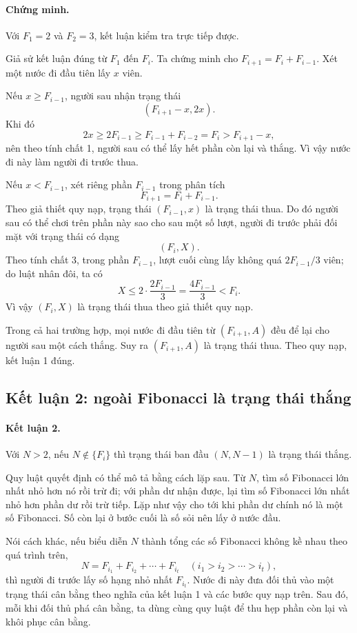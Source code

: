 \documentclass[11pt]{article}
\begin{document}
\paragraph{Chứng minh.}
Với \(F_1=2\) và \(F_2=3\), kết luận kiểm tra trực tiếp được.

Giả sử kết luận đúng từ \(F_1\) đến \(F_i\). Ta chứng minh cho
\(F_{i+1}=F_i+F_{i-1}\). Xét một nước đi đầu tiên lấy \(x\) viên.

Nếu \(x\ge F_{i-1}\), người sau nhận trạng thái
\[
  (F_{i+1}-x,2x).
\]
Khi đó
\[
  2x\ge 2F_{i-1}\ge F_{i-1}+F_{i-2}=F_i>F_{i+1}-x,
\]
nên theo tính chất 1, người sau có thể lấy hết phần còn lại và thắng. Vì vậy
nước đi này làm người đi trước thua.

Nếu \(x<F_{i-1}\), xét riêng phần \(F_{i-1}\) trong phân tích
\[
  F_{i+1}=F_i+F_{i-1}.
\]
Theo giả thiết quy nạp, trạng thái \((F_{i-1},x)\) là trạng thái thua. Do đó
người sau có thể chơi trên phần này sao cho sau một số lượt, người đi trước
phải đối mặt với trạng thái có dạng
\[
  (F_i,X).
\]
Theo tính chất 3, trong phần \(F_{i-1}\), lượt cuối cùng lấy không quá
\(2F_{i-1}/3\) viên; do luật nhân đôi, ta có
\[
  X\le 2\cdot \frac{2F_{i-1}}{3}
   =\frac{4F_{i-1}}{3}<F_i.
\]
Vì vậy \((F_i,X)\) là trạng thái thua theo giả thiết quy nạp.

Trong cả hai trường hợp, mọi nước đi đầu tiên từ \((F_{i+1},A)\) đều để lại
cho người sau một cách thắng. Suy ra \((F_{i+1},A)\) là trạng thái thua. Theo
quy nạp, kết luận 1 đúng.

\subsection{Kết luận 2: ngoài Fibonacci là trạng thái thắng}

\paragraph{Kết luận 2.}
Với \(N>2\), nếu \(N\notin\{F_i\}\) thì trạng thái ban đầu \((N,N-1)\) là
trạng thái thắng.

Quy luật quyết định có thể mô tả bằng cách lặp sau. Từ \(N\), tìm số
Fibonacci lớn nhất nhỏ hơn nó rồi trừ đi; với phần dư nhận được, lại tìm số
Fibonacci lớn nhất nhỏ hơn phần dư rồi trừ tiếp. Lặp như vậy cho tới khi phần
dư chính nó là một số Fibonacci. Số còn lại ở bước cuối là số sỏi nên lấy ở
nước đầu.

Nói cách khác, nếu biểu diễn \(N\) thành tổng các số Fibonacci không kề nhau
theo quá trình trên,
\[
  N=F_{i_1}+F_{i_2}+\cdots+F_{i_t}
  \quad(i_1>i_2>\cdots>i_t),
\]
thì người đi trước lấy số hạng nhỏ nhất \(F_{i_t}\). Nước đi này đưa đối thủ
vào một trạng thái cân bằng theo nghĩa của kết luận 1 và các bước quy nạp
trên. Sau đó, mỗi khi đối thủ phá cân bằng, ta dùng cùng quy luật để thu hẹp
phần còn lại và khôi phục cân bằng.
\end{document}
